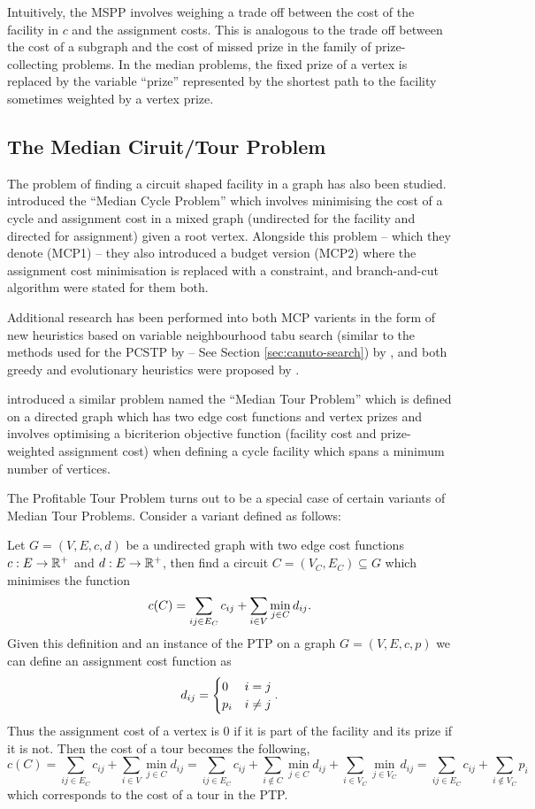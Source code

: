  Intuitively, the MSPP involves weighing a trade off between the cost of the facility
 in $c$ and the assignment costs. 
 This is analogous to the trade off between the cost of a subgraph and the cost of missed prize in the
 family of prize-collecting problems. In the median problems, the fixed prize of a vertex is
 replaced by the variable ``prize'' represented by the shortest path to the facility sometimes weighted
 by a vertex prize.
 \subsection{The Median Ciruit/Tour Problem}
 The problem of finding a circuit shaped facility in a graph has also been studied.
 \citet{labbe1999themedian} introduced the ``Median Cycle Problem'' which involves
 minimising the cost of a cycle and assignment cost in a mixed graph (undirected for
 the facility and directed for assignment) given a root vertex. Alongside this problem
 -- which they denote (MCP1) -- they also introduced a budget version (MCP2) where the
 assignment cost minimisation is replaced with a constraint, and branch-and-cut algorithm
 were stated for them both.

 Additional research has been performed into both MCP varients
 in the form of new heuristics based on variable neighbourhood tabu search
 (similar to the methods used for the PCSTP by \citet{canuto2001local} --
 See Section \ref{sec:canuto-search}) by \citet{perez2003variable}, and both
 greedy and evolutionary heuristics were proposed by \citet{renaud2004efficient}.
 
 \citet{current1994median} introduced a similar problem named the ``Median Tour Problem''
 which is defined on a directed graph which has two edge cost functions and vertex prizes
 and involves optimising a bicriterion objective function
 (facility cost and prize-weighted assignment cost)
 when defining a cycle facility which spans a minimum number of vertices.

 The Profitable Tour Problem turns out to be a special case of certain variants of Median
 Tour Problems. Consider a variant defined as follows:

 Let $G = (V, E, c, d)$ be a undirected graph with two edge cost functions
 $c : E \to \mathbb{R}^+$ and $d : E \to \mathbb{R}^+$, then find a circuit $C = (V_C, E_C) \subseteq G$
 which minimises
 the function
 $$c(C) = \sum_{ij \in E_C} c_{ij} + \sum_{i \in V} \min_{j \in C} d_{ij} \mathnormal{.}$$
 Given this definition and an instance of the PTP on a graph $G = (V, E, c, p)$
 we can define an assignment cost function as
 $$d_{ij} =
 \begin{cases}
   0 & i = j \\
   p_i & i \neq j
 \end{cases}\mathnormal{.}
 $$
 Thus the assignment cost of a vertex is 0 if it is part of the facility and its prize
 if it is not. Then the cost of a tour becomes the following,
 $$c(C) = \sum_{ij \in E_C} c_{ij} + \sum_{i \in V} \min_{j \in C} d_{ij} =
 \sum_{ij \in E_C} c_{ij} + \sum_{i \not\in C} \min_{j \in C} d_{ij} + \sum_{i \in V_C} \min_{j \in V_C} d_{ij}
 = \sum_{ij \in E_C} c_{ij} + \sum_{i \not\in V_C}  p_i$$
 which corresponds to the cost of a tour in the PTP.
